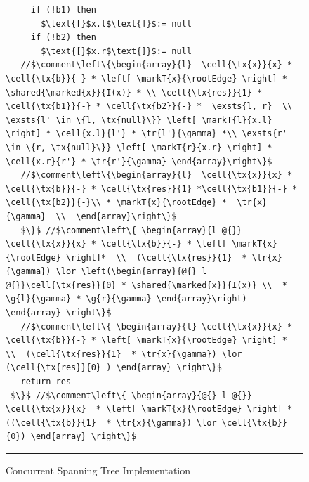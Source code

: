\begin{figure}
\begin{lstlisting}
     if (!b1) then 
       $\text{[}$x.l$\text{]}$:= null
     if (!b2) then 
       $\text{[}$x.r$\text{]}$:= null
   //$\comment\left\{\begin{array}{l}  \cell{\tx{x}}{x} * \cell{\tx{b}}{-} * \left[ \markT{x}{\rootEdge} \right] * \shared{\marked{x}}{I(x)} * \\ \cell{\tx{res}}{1} * \cell{\tx{b1}}{-} * \cell{\tx{b2}}{-} *  \exsts{l, r}  \\ \exsts{l' \in \{l, \tx{null}\}} \left[ \markT{l}{x.l} \right] * \cell{x.l}{l'} * \tr{l'}{\gamma} *\\ \exsts{r' \in \{r, \tx{null}\}} \left[ \markT{r}{x.r} \right] * \cell{x.r}{r'} * \tr{r'}{\gamma} \end{array}\right\}$  
   //$\comment\left\{\begin{array}{l}  \cell{\tx{x}}{x} * \cell{\tx{b}}{-} * \cell{\tx{res}}{1} *\cell{\tx{b1}}{-} * \cell{\tx{b2}}{-}\\ * \markT{x}{\rootEdge} *  \tr{x}{\gamma}  \\  \end{array}\right\}$         
   $\}$ //$\comment\left\{ \begin{array}{l @{}} \cell{\tx{x}}{x} * \cell{\tx{b}}{-} * \left[ \markT{x}{\rootEdge} \right]*  \\  (\cell{\tx{res}}{1}  * \tr{x}{\gamma}) \lor \left(\begin{array}{@{} l @{}}\cell{\tx{res}}{0} * \shared{\marked{x}}{I(x)} \\  * \g{l}{\gamma} * \g{r}{\gamma} \end{array}\right) \end{array} \right\}$ 
   //$\comment\left\{ \begin{array}{l} \cell{\tx{x}}{x} * \cell{\tx{b}}{-} * \left[ \markT{x}{\rootEdge} \right] *  \\  (\cell{\tx{res}}{1}  * \tr{x}{\gamma}) \lor (\cell{\tx{res}}{0} ) \end{array} \right\}$      
   return res
 $\}$ //$\comment\left\{ \begin{array}{@{} l @{}} \cell{\tx{x}}{x}  * \left[ \markT{x}{\rootEdge} \right] *  ((\cell{\tx{b}}{1}  * \tr{x}{\gamma}) \lor \cell{\tx{b}}{0}) \end{array} \right\}$         
\end{lstlisting}
\hrule\vspace*{-6pt}
\caption{Concurrent Spanning Tree Implementation}
\label{fig:conSpanningTree}
\end{figure}
%
%
\vspace{-2ex}
